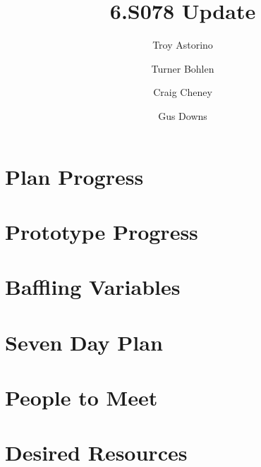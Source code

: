 \documentclass[10pt]{article}
\title{\vspace{-4em}6.S078 Update}
\author{Troy Astorino \and Turner Bohlen \and Craig Cheney \and Gus Downs}
\begin{document}
\maketitle
\vspace{-4em}

\section{Plan Progress}

\section{Prototype Progress}

\section{Baffling Variables}

\section{Seven Day Plan}

\section{People to Meet}

\section{Desired Resources}
\end{document}
